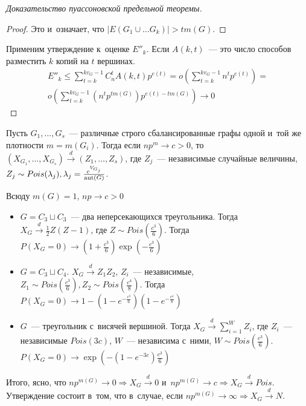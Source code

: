 \documentclass{article}
\begin{document}
\begin{proof}[Доказательство пуассоновской предельной теоремы]
\begin{proof}
		Это и~означает, что $|E(G_1 \cup \ldots G_k)| > tm(G)$.
	\end{proof}

	Применим утверждение к~оценке $E''_k$. Если $A(k, t)$~--- это число способов
	разместить $k$ копий на $t$ вершинах.
	\begin{multline*}
		E''_k \le \sum\limits_{t=k}^{kv_G - 1} C_n^t A(k, t) p^{e(t)} =
		o\left(\sum\limits_{t=k}^{kv_G - 1} n^t p^{e(t)}\right) =\\
		o\left(\sum\limits_{t=k}^{kv_G - 1} (n^t p^{tm(G)}) p^{e(t) - tm(G)} \right)
		\rightarrow 0
	\end{multline*}
\end{proof}

\begin{theorem}
	Пусть $G_1, \ldots, G_s$~--- различные строго сбалансированные графы одной
	и~той же плотности $m = m(G_i)$. Тогда если $np^m \rightarrow c > 0$, то
	$(X_{G_1}, \ldots, X_{G_s}) \overset{d}\rightarrow (Z_1, \ldots, Z_s)$, где
	$Z_j$~--- независимые случайные величины, $Z_j \sim Pois(\lambda_j), \lambda_j
	= \frac{c^{V_{G_j}}}{\operatorname{aut}(G)}$.
\end{theorem}

\begin{example}
	Всюду $m(G) = 1$, $np \rightarrow c > 0$
	\begin{itemize}
		\item $G = C_3 \sqcup C_3$~--- два неперсекающихся треугольника. Тогда $X_G
			\overset{d}\rightarrow \frac{1}{2}Z(Z-1)$, где $Z \sim
			Pois(\frac{c^3}{6})$. Тогда $P(X_G = 0) \rightarrow (1 +
			\frac{c^3}{6})\exp(-\frac{c^3}{6})$
		\item $G = C_3 \sqcup C_4$. $X_G \overset{d}\rightarrow Z_1 Z_2$, $Z_i$~---
			независимые, $Z_1 \sim Pois\left(\frac{c^3}{6}\right),
			Z_2 \sim Pois\left(\frac{c^4}{8}\right)$.
			Тогда $P(X_G = 0) \rightarrow 1 - (1 - e^{-\frac{c^3}{6}})(1 -
			e^{-\frac{c^4}{8}})$
		\item $G$~--- треугольник с~висячей вершиной. Тогда $X_G
			\overset{d}\rightarrow \sum_{i=1}^W Z_i$, где $Z_i$~--- независимые
			$Pois(3c)$, $W$~--- независима с~ними, $W\sim
			Pois\left(\frac{c^3}{6}\right)$.
			$P(X_G = 0) \rightarrow \exp\left(-(1 - e^{-3c})\frac{c^3}{6}\right)$
	\end{itemize}
\end{example}

Итого, ясно, что $np^{m(G)} \rightarrow 0 \Rightarrow X_G \overset{d}\rightarrow
0$ и~$np^{m(G)} \rightarrow c \Rightarrow X_G \overset{d}\rightarrow Pois$.
Утверждение состоит в~том, что в~случае, если $np^{m(G)} \rightarrow \infty
\Rightarrow X_G \overset{d}\rightarrow N$.
\end{document}
